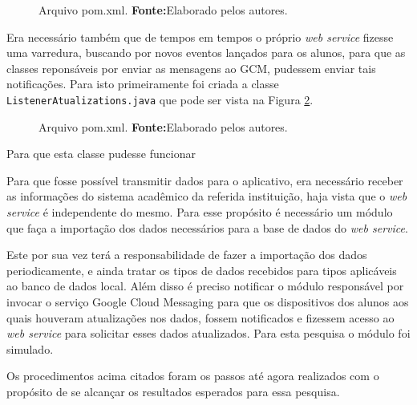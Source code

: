 	\begin{figure}[h!]
		
		\caption[Arquivo \texttt{pom.xml}]{Arquivo pom.xml.
		\textbf{Fonte:}Elaborado pelos autores.}
		\label{fig:desws32}
	\end{figure}
		
	\par Era necessário também que  de tempos em tempos o próprio \textit{web
service} fizesse uma varredura, buscando por novos eventos lançados para os
alunos, para que as classes reponsáveis por enviar as mensagens ao GCM, pudessem
enviar tais notificações. Para isto primeiramente foi criada a classe
\texttt{ListenerAtualizations.java} que pode ser vista na Figura
\ref{fig:desws33}.

	\begin{figure}[h!]
		
		\caption[Arquivo \texttt{pom.xml}]{Arquivo pom.xml.
		\textbf{Fonte:}Elaborado pelos autores.}
		\label{fig:desws33}
	\end{figure}

	\par Para que esta classe pudesse funcionar

	\par Para que fosse possível transmitir dados para o aplicativo, era
necessário receber as informações do sistema acadêmico da referida instituição,
haja vista que o \textit{web service} é independente do mesmo. Para esse
propósito é necessário um módulo que faça a importação dos dados necessários
para a base de dados do \textit{web service}.

	\par Este por sua vez terá a responsabilidade de fazer a importação dos dados
periodicamente, e ainda tratar os tipos de dados recebidos para tipos
aplicáveis ao banco de dados local. Além disso é preciso notificar o módulo
responsável por invocar o serviço Google Cloud Messaging para que os
dispositivos dos alunos aos quais houveram atualizações nos dados, fossem
notificados e fizessem acesso ao \textit{web service} para solicitar esses
dados atualizados. Para esta pesquisa o módulo foi simulado.

	\par Os procedimentos acima citados foram os passos até agora realizados com o
propósito de se alcançar os resultados esperados para essa pesquisa.

